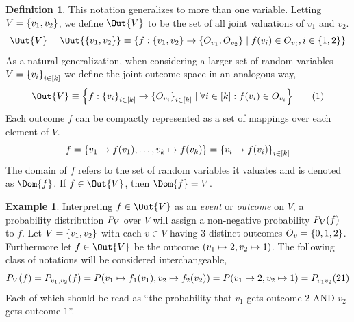 \documentclass[aps, 10pt, english, twoside, pra, nofootinbib, longbibliography]{revtex4-1}
\theoremstyle{plain}
\theoremstyle{definition}
\newtheorem{definition}[theorem]{Definition}
\newtheorem{example}[theorem]{Example}
\theoremstyle{remark}
\newcommand{\outc}[1]{o\bs{#1}} %
\begin{document}
    \begin{definition}
        This notation generalizes to more than one variable. Letting $V = \bc{v_1, v_2}$, we define $\Out{V}$ to be the set of all joint valuations of $v_1$ and $v_2$.
        \[ \Out{V} = \Out{\bc{v_1, v_2}} \defined \bc{f : \bc{v_1, v_2} \to \bc{O_{v_1}, O_{v_2}} \mid f\br{v_i} \in O_{v_i}, i \in \bc{1,2}}  \]
        As a natural generalization, when considering a larger set of random variables $V = \bc{v_i}_{i \in \bs{k}}$ we define the joint outcome space in an analogous way,
        \[ \Out{V} \defined \bc{f: \bc{v_i}_{i \in \bs{k}} \to \bc{O_{v_i}}_{i \in \bs{k}} \mid \forall i \in \bs{k} : f\br{v_i} \in O_{v_i} } \eq \label{eq:outcome_space}\]
        Each outcome $f$ can be compactly represented as a set of mappings over each element of $V$.
        \[ f = \bc{v_1 \mapsto f\br{v_1}, \ldots, v_k \mapsto f\br{v_k}} = \bc{v_i\mapsto f\br{v_i}}_{i \in \bs{k}} \]
        The domain of $f$ refers to the set of random variables it valuates and is denoted as $\Dom{f}$. If $f \in \Out{V}$, then $\Dom{f} = V$.

    \end{definition}

    \begin{example}
        Interpreting $f \in \Out{V}$ as an \textit{event} or \textit{outcome} on $V$, a probability distribution $\prob[V]$ over $V$ will assign a non-negative probability $\prob[V][f]$ to $f$. Let $V = \bc{v_1, v_2}$ with each $v \in V$ having $3$ distinct outcomes $O_v = \bc{0,1,2}$. Furthermore let $f \in \Out{V}$ be the outcome $\br{v_1 \mapsto 2, v_2 \mapsto 1}$. The following class of notations will be considered interchangeable,
        \[ \prob[V][f] = \prob[v_1, v_2][f] = \prob[][v_1 \mapsto f_1\br{v_1}, v_2 \mapsto f_2\br{v_2}] = \prob[][v_1 \mapsto 2, v_2 \mapsto 1] = \prob[v_1v_2][21] \]
        Each of which should be read as ``the probability that $v_1$ gets outcome $2$ AND $v_2$ gets outcome $1$''.
    \end{example}
\end{document}
